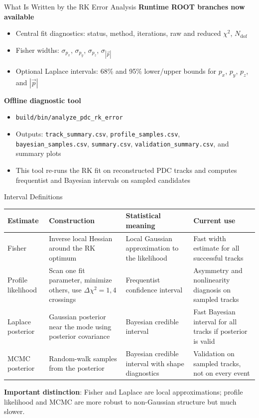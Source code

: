 \documentclass[aspectratio=169]{beamer}
\begin{document}
\begin{frame}{What Is Written by the RK Error Analysis}
\small
\textbf{Runtime ROOT branches now available}
\begin{itemize}
\item Central fit diagnostics: status, method, iterations, raw and reduced \(\chi^2\), \(N_{\mathrm{dof}}\)
\item Fisher widths: \(\sigma_{p_x}\), \(\sigma_{p_y}\), \(\sigma_{p_z}\), \(\sigma_{|\vec p|}\)
\item Optional Laplace intervals: 68\% and 95\% lower/upper bounds for \(p_x\), \(p_y\), \(p_z\), and \(|\vec p|\)
\end{itemize}

\vspace{0.2cm}
\textbf{Offline diagnostic tool}
\begin{itemize}
\item \texttt{build/bin/analyze\_pdc\_rk\_error}
\item Outputs: \texttt{track\_summary.csv}, \texttt{profile\_samples.csv}, \texttt{bayesian\_samples.csv}, \texttt{summary.csv}, \texttt{validation\_summary.csv}, and summary plots
\item This tool re-runs the RK fit on reconstructed PDC tracks and computes frequentist and Bayesian intervals on sampled candidates
\end{itemize}
\end{frame}

\begin{frame}{Interval Definitions}
\small
\begin{table}
\centering
\begin{tabular}{p{}p{}p{}p{}}
\toprule
Estimate & Construction & Statistical meaning & Current use \\
\midrule
Fisher & Inverse local Hessian around the RK optimum & Local Gaussian approximation to the likelihood & Fast width estimate for all successful tracks \\
Profile likelihood & Scan one fit parameter, minimize others, use \(\Delta\chi^2=1,4\) crossings & Frequentist confidence interval & Asymmetry and nonlinearity diagnosis on sampled tracks \\
Laplace posterior & Gaussian posterior near the mode using posterior covariance & Bayesian credible interval & Fast Bayesian interval for all tracks if posterior is valid \\
MCMC posterior & Random-walk samples from the posterior & Bayesian credible interval with shape diagnostics & Validation on sampled tracks, not on every event \\
\bottomrule
\end{tabular}
\end{table}

\vspace{0.1cm}
\textbf{Important distinction}: Fisher and Laplace are local approximations; profile likelihood and MCMC are more robust to non-Gaussian structure but much slower.
\end{frame}
\end{document}
